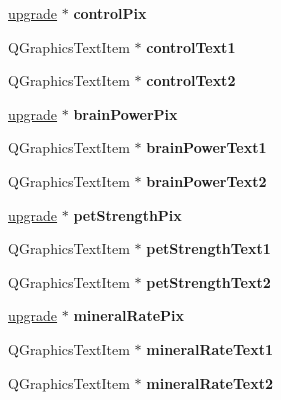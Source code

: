 \begin{DoxyCompactItemize}
\item 
\hypertarget{class_dialog_a544de0c7960f5298cd6623f830fa46f4}{\hyperlink{classupgrade}{upgrade} $\ast$ {\bfseries control\-Pix}}\label{class_dialog_a544de0c7960f5298cd6623f830fa46f4}

\item 
\hypertarget{class_dialog_a6d3e2bd64f61dfc004f8aa15755837cb}{Q\-Graphics\-Text\-Item $\ast$ {\bfseries control\-Text1}}\label{class_dialog_a6d3e2bd64f61dfc004f8aa15755837cb}

\item 
\hypertarget{class_dialog_a0854ba8c751f2b843f42d9194400c2bf}{Q\-Graphics\-Text\-Item $\ast$ {\bfseries control\-Text2}}\label{class_dialog_a0854ba8c751f2b843f42d9194400c2bf}

\item 
\hypertarget{class_dialog_a6001ecce89eebd731e0387bbcf953dde}{\hyperlink{classupgrade}{upgrade} $\ast$ {\bfseries brain\-Power\-Pix}}\label{class_dialog_a6001ecce89eebd731e0387bbcf953dde}

\item 
\hypertarget{class_dialog_a0b1df4c800c3bc86dbdecddb791d30d7}{Q\-Graphics\-Text\-Item $\ast$ {\bfseries brain\-Power\-Text1}}\label{class_dialog_a0b1df4c800c3bc86dbdecddb791d30d7}

\item 
\hypertarget{class_dialog_a62721a387b2532f1261331a0441520f1}{Q\-Graphics\-Text\-Item $\ast$ {\bfseries brain\-Power\-Text2}}\label{class_dialog_a62721a387b2532f1261331a0441520f1}

\item 
\hypertarget{class_dialog_aeb877356563fb847370084ff450b02cd}{\hyperlink{classupgrade}{upgrade} $\ast$ {\bfseries pet\-Strength\-Pix}}\label{class_dialog_aeb877356563fb847370084ff450b02cd}

\item 
\hypertarget{class_dialog_a656e3c20aafa0edc2582e8d6e4cf0633}{Q\-Graphics\-Text\-Item $\ast$ {\bfseries pet\-Strength\-Text1}}\label{class_dialog_a656e3c20aafa0edc2582e8d6e4cf0633}

\item 
\hypertarget{class_dialog_ad8fbe2aecc886560ec05c39f0cf7d15a}{Q\-Graphics\-Text\-Item $\ast$ {\bfseries pet\-Strength\-Text2}}\label{class_dialog_ad8fbe2aecc886560ec05c39f0cf7d15a}

\item 
\hypertarget{class_dialog_a98df629fdf12d92de1e3c0d7d053c6d2}{\hyperlink{classupgrade}{upgrade} $\ast$ {\bfseries mineral\-Rate\-Pix}}\label{class_dialog_a98df629fdf12d92de1e3c0d7d053c6d2}

\item 
\hypertarget{class_dialog_a699393b24abff1168487d5e8ec4d19d4}{Q\-Graphics\-Text\-Item $\ast$ {\bfseries mineral\-Rate\-Text1}}\label{class_dialog_a699393b24abff1168487d5e8ec4d19d4}

\item 
\hypertarget{class_dialog_a19bd501376bd63a6b2edc875c365cf37}{Q\-Graphics\-Text\-Item $\ast$ {\bfseries mineral\-Rate\-Text2}}\label{class_dialog_a19bd501376bd63a6b2edc875c365cf37}

\end{DoxyCompactItemize}


